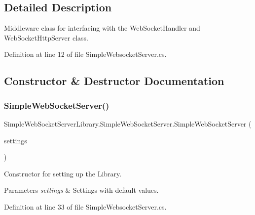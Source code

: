 \subsection{Detailed Description}
Middleware class for interfacing with the Web\+Socket\+Handler and Web\+Socket\+Http\+Server class. 



Definition at line 12 of file Simple\+Websocket\+Server.\+cs.



\subsection{Constructor \& Destructor Documentation}
\mbox{\label{class_simple_web_socket_server_library_1_1_simple_web_socket_server_af3cde755fdb2781292c27174161508ed}} 
\subsubsection{\texorpdfstring{Simple\+Web\+Socket\+Server()}{SimpleWebSocketServer()}\hspace{0.1cm}{\footnotesize\ttfamily [1/2]}}
{\footnotesize\ttfamily Simple\+Web\+Socket\+Server\+Library.\+Simple\+Web\+Socket\+Server.\+Simple\+Web\+Socket\+Server (\begin{DoxyParamCaption}\item[{\mbox{\hyperlink{class_simple_web_socket_server_library_1_1_simple_web_socket_server_settings}{Simple\+Web\+Socket\+Server\+Settings}}}]{settings }\end{DoxyParamCaption})}



Constructor for setting up the Library. 


\begin{DoxyParams}{Parameters}
{\em settings} & Settings with default values.\\
\hline
\end{DoxyParams}


Definition at line 33 of file Simple\+Websocket\+Server.\+cs.

